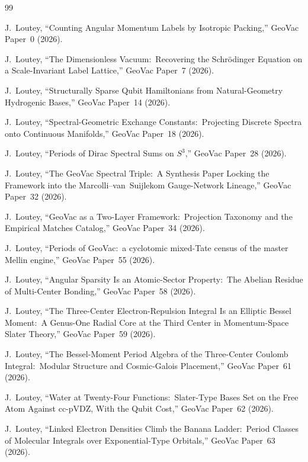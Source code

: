 \documentclass[aps,pra,twocolumn,superscriptaddress,longbibliography]{revtex4-2}
\begin{document}
\begin{thebibliography}{99}

J.~Loutey, ``Counting Angular Momentum Labels by Isotropic Packing,''
GeoVac Paper~0 (2026).

J.~Loutey, ``The Dimensionless Vacuum:\ Recovering the Schr\"odinger
Equation on a Scale-Invariant Label Lattice,'' GeoVac Paper~7 (2026).

J.~Loutey, ``Structurally Sparse Qubit Hamiltonians from Natural-Geometry
Hydrogenic Bases,'' GeoVac Paper~14 (2026).

J.~Loutey, ``Spectral-Geometric Exchange Constants:\ Projecting Discrete
Spectra onto Continuous Manifolds,'' GeoVac Paper~18 (2026).

J.~Loutey, ``Periods of Dirac Spectral Sums on $S^3$,'' GeoVac Paper~28
(2026).

J.~Loutey, ``The GeoVac Spectral Triple:\ A Synthesis Paper Locking the
Framework into the Marcolli--van~Suijlekom Gauge-Network Lineage,''
GeoVac Paper~32 (2026).

J.~Loutey, ``GeoVac as a Two-Layer Framework:\ Projection Taxonomy and
the Empirical Matches Catalog,'' GeoVac Paper~34 (2026).

J.~Loutey, ``Periods of GeoVac:\ a cyclotomic mixed-Tate census of the
master Mellin engine,'' GeoVac Paper~55 (2026).

J.~Loutey, ``Angular Sparsity Is an Atomic-Sector Property:\ The Abelian
Residue of Multi-Center Bonding,'' GeoVac Paper~58 (2026).

J.~Loutey, ``The Three-Center Electron-Repulsion Integral Is an Elliptic
Bessel Moment:\ A Genus-One Radial Core at the Third Center in
Momentum-Space Slater Theory,'' GeoVac Paper~59 (2026).

J.~Loutey, ``The Bessel-Moment Period Algebra of the Three-Center Coulomb
Integral:\ Modular Structure and Cosmic-Galois Placement,'' GeoVac
Paper~61 (2026).

J.~Loutey, ``Water at Twenty-Four Functions:\ Slater-Type Bases Set on
the Free Atom Against cc-pVDZ, With the Qubit Cost,'' GeoVac Paper~62
(2026).

J.~Loutey, ``Linked Electron Densities Climb the Banana Ladder:\ Period
Classes of Molecular Integrals over Exponential-Type Orbitals,'' GeoVac
Paper~63 (2026).


\end{thebibliography}
\end{document}
